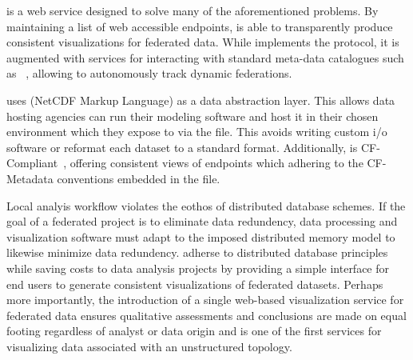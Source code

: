  \sciwms{} is a web service designed to solve many of the
aforementioned problems. By maintaining a list of web accessible
endpoints, \sciwms{} is able to transparently produce consistent
visualizations for federated data. While \sciwms{} implements the
\ogc{} \wms{} protocol, it is augmented with services for interacting
with standard meta-data catalogues such as \csw{}~\cite{csw14},
allowing \sciwms{} to autonomously track dynamic federations.

\sciwms{} uses \ncml{} (NetCDF Markup Language) as a data abstraction
layer. This allows data hosting agencies can run their modeling
software and host it in their chosen environment which they expose to
\sciwms{} via the \ncml{} file. This avoids writing custom i/o
software or reformat each dataset to a standard format. Additionally,
\sciwms{} is CF-Compliant~\cite{cf}, offering consistent views of
endpoints which adhering to the CF-Metadata conventions embedded in
the \ncml{} file.

Local analyis workflow violates the eothos of distributed database
schemes. If the goal of a federated project is to eliminate data
redundency, data processing and visualization software must adapt to
the imposed distributed memory model to likewise minimize data
redundency. \sciwms{} adherse to distributed database principles while
saving costs to data analysis projects by providing a simple interface
for end users to generate consistent visualizations of federated
datasets. Perhaps more importantly, the introduction of a single
web-based visualization service for federated data ensures qualitative
assessments and conclusions are made on equal footing regardless of
analyst or data origin and is one of the first services for
visualizing data associated with an unstructured topology.
